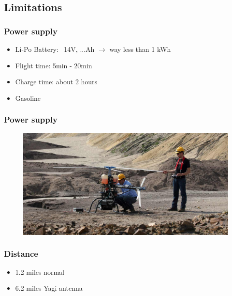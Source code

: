 \subsection{Limitations}

\begin{frame}
\frametitle{Power supply}

  \begin{itemize}
    \item Li-Po Battery: ~14V, ...Ah $\rightarrow$ way less than 1 kWh
    \item Flight time: 5min - 20min
    \item Charge time: about 2 hours
	\item Gasoline
  \end{itemize}
  
\end{frame}



\begin{frame}
\frametitle{Power supply}

  \begin{figure}
  \includegraphics[scale=0.24]{pic/03_our-copter/aeroscout.jpg}
  \end{figure}
  
\end{frame}



\begin{frame}
\frametitle{Distance}

  \begin{itemize}
    \item 1.2 miles normal
    \item 6.2 miles Yagi antenna
  \end{itemize}
  
    
\end{frame}



